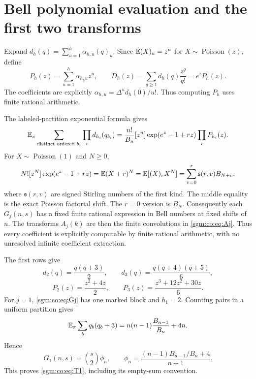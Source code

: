 \documentclass[11pt,letterpaper]{article}
\theoremstyle{remark}\newtheorem{remark}[theorem]{Remark}
\newcommand{\Poi}{\operatorname{Poisson}}\newcommand{\Bin}{\operatorname{Bin}}
\theoremstyle{definition}\newtheorem{definition}[theorem]{Definition}
\begin{document}
\section{Bell polynomial evaluation and the first two transforms}\label{sgm:co:sec:Bellcoefficients}
Expand $d_h(q)=\sum_{u=1}^h\alpha_{h,u}(q)_u$. Since $\mathbb E(X)_u=z^u$ for $X\sim\Poi(z)$, define
\begin{equation}\label{sgm:co:eq:Ph}
 P_h(z)=\sum_{u=1}^h\alpha_{h,u}z^u,\qquad
 D_h(z)=\sum_{q\ge1}d_h(q)\frac{z^q}{q!}=e^zP_h(z).
\end{equation}
The coefficients are explicitly $\alpha_{h,u}=\Delta^ud_h(0)/u!$. Thus computing $P_h$ uses finite rational arithmetic.

The labeled-partition exponential formula gives
\begin{equation}\label{sgm:co:eq:markedEGF}
 \mathbb E_\pi\sum_{\text{distinct ordered }b_i}\prod_i d_{h_i}(q_{b_i})
 =\frac{n!}{B_n}[z^n]\exp(e^z-1+rz)\prod_iP_{h_i}(z).
\end{equation}
For $X\sim\Poi(1)$ and $N\ge0$,
\begin{equation}\label{sgm:co:eq:Bellshift}
 N![z^N]\exp(e^z-1+rz)=\mathbb E(X+r)^N
 =\mathbb E[(X)_rX^N]=\sum_{v=0}^r\mathfrak{s}(r,v)B_{N+v},
\end{equation}
where $\mathfrak{s}(r,v)$ are signed Stirling numbers of the first kind. The middle equality is the exact Poisson factorial shift. The $r=0$ version is $B_N$. Consequently each $G_j(n,s)$ has a fixed finite rational expression in Bell numbers at fixed shifts of $n$. The transforms $A_j(k)$ are then the finite convolutions in \eqref{sgm:co:eq:Aj}. Thus every coefficient is explicitly computable by finite rational arithmetic, with no unresolved infinite coefficient extraction.

The first rows give
\[
 d_2(q)=\frac{q(q+3)}2,\qquad
 d_3(q)=\frac{q(q+4)(q+5)}6,
\]
\begin{equation}\label{sgm:co:eq:P23}
 P_2(z)=\frac{z^2+4z}{2},\qquad
 P_3(z)=\frac{z^3+12z^2+30z}{6}.
\end{equation}
For $j=1$, \eqref{sgm:co:eq:Gj} has one marked block and $h_1=2$. Counting pairs in a uniform partition gives
\[
 \mathbb E_\pi\sum_bq_b(q_b+3)=n(n-1)\frac{B_{n-1}}{B_n}+4n.
\]
Hence
\begin{equation}\label{sgm:co:eq:G1}
 G_1(n,s)=\binom s2\phi_n,\qquad
 \phi_n=\frac{(n-1)B_{n-1}/B_n+4}{n+1}.
\end{equation}
This proves \eqref{sgm:co:eq:T1}, including its empty-sum convention.
\end{document}
